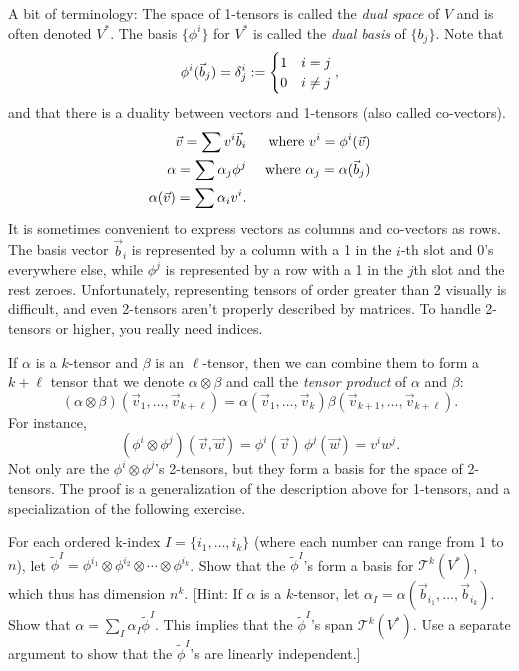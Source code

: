 \documentclass[12pt]{amsbook}
\newcommand{\T}{{\mathcal T}}
\theoremstyle{definition}
\begin{document}
A bit of terminology: The space of 1-tensors is called the {\em dual space}
of $V$ and is often denoted $V^*$. The basis $\{\phi^i\}$ for $V^*$ is 
called the {\em dual basis} of $\{b_j\}$.  Note that 
$$\phi^i(\vec b_j) = \delta^i_j := \begin{cases} 1 & i=j \cr 0 & i \ne j \end{cases},$$
and that there is a duality between vectors and 1-tensors (also called
co-vectors).
\begin{eqnarray}
\vec v = \sum v^i \vec b_i && \hbox{ where } v^i=\phi^i(\vec v) \cr 
\alpha = \sum \alpha_j \phi^j && \hbox{ where } \alpha_j = \alpha(\vec b_j) \cr 
\alpha(\vec v) = \sum \alpha_i v^i.
\end{eqnarray}
It is sometimes convenient to express vectors as columns and
co-vectors as rows. The basis vector $\vec b_i$ is represented by a
column with a 1 in the $i$-th slot and 0's everywhere else, while
$\phi^j$ is represented by a row with a 1 in the $j$th slot and the
rest zeroes. Unfortunately, representing tensors of order greater than
2 visually is difficult, and even 2-tensors aren't properly
described by matrices. To handle 2-tensors or higher, you really
need indices.

If $\alpha$ is a $k$-tensor and $\beta$ is an $\ell$-tensor, then we
can combine them to form a $k+\ell$ tensor that we denote $\alpha
\otimes \beta$ and call the {\em tensor product} of $\alpha$ and
$\beta$:
$$ (\alpha \otimes \beta) (\vec v_1,\ldots, \vec v_{k+\ell}) = \alpha(\vec v_1,\ldots,\vec v_k) \beta(\vec v_{k+1},\ldots, \vec v_{k+\ell}).$$
For instance, 
$$ (\phi^i\otimes \phi^j) (\vec v, \vec w) = \phi^i(\vec v)\, 
\phi^j(\vec w) = v^i w^j.$$
Not only are the $\phi^i \otimes \phi^j$'s 2-tensors, but they form a
basis for the space of 2-tensors. The proof is a generalization of the
description above for 1-tensors, and a specialization of the following
exercise.

\smallskip

 For each ordered k-index
$I=\{i_1,\ldots,i_k\}$ (where each number can range from 1 to $n$),
let $\tilde \phi^I = \phi^{i_1} \otimes \phi^{i_2} \otimes \cdots \otimes
\phi^{i_k}$. Show that the $\tilde \phi^I$'s form a basis for $\T^k(V^*)$,
which thus has dimension $n^k$.  [Hint: If $\alpha$ is a
$k$-tensor, let $\alpha_I=\alpha(\vec b_{i_1},\ldots, \vec b_{i_k})$.
Show that $\alpha = \sum_I \alpha_I \tilde \phi^I$. This implies that the
$\tilde \phi^I$'s span $\T^k(V^*)$.  Use a separate argument to show
that the $\tilde \phi^I$'s are linearly independent.]
\end{document}
